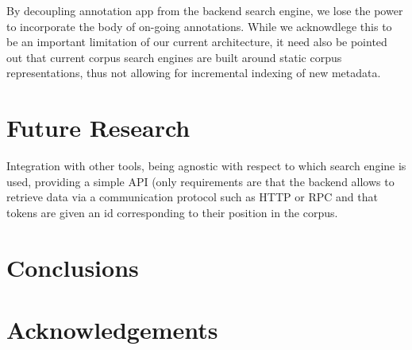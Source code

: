 \documentclass{sig-alternate}
\begin{document}
By decoupling annotation app from the backend search engine, we lose the power to incorporate
the body of on-going annotations.
While we acknowdlege this to be an important limitation of our current architecture, it need
also be pointed out that current corpus search engines are built around static corpus
representations, thus not allowing for incremental indexing of new metadata.

\section{Future Research}\label{sec:future}
Integration with other tools, being agnostic with respect to which search engine is used,
providing a simple API (only requirements are that the backend allows to retrieve data via
a communication protocol such as HTTP or RPC and that tokens are given an id corresponding
to their position in the corpus.


\section{Conclusions}\label{sec:conclusion}

\section{Acknowledgements}



%
%

\end{document}
